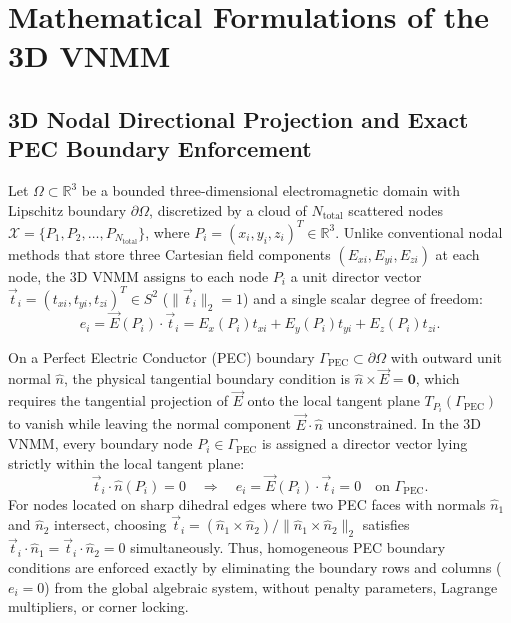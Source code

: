 \documentclass[preprint,12pt]{elsarticle}
\newcommand{\R}{\mathbb{R}}
\begin{document}
\section{Mathematical Formulations of the 3D VNMM}
\label{sec:formulation}

\subsection{3D Nodal Directional Projection and Exact PEC Boundary Enforcement}
\label{subsec:nodal_projection_3d}

Let $\Omega \subset \R^3$ be a bounded three-dimensional electromagnetic domain with Lipschitz boundary $\partial\Omega$, discretized by a cloud of $N_{\text{total}}$ scattered nodes $\mathcal{X} = \{P_1, P_2, \dots, P_{N_{\text{total}}}\}$, where $P_i = (x_i, y_i, z_i)^T \in \R^3$. Unlike conventional nodal methods that store three Cartesian field components $(E_{xi}, E_{yi}, E_{zi})$ at each node, the 3D VNMM assigns to each node $P_i$ a unit director vector $\vec{t}_i = (t_{xi}, t_{yi}, t_{zi})^T \in S^2$ ($\|\vec{t}_i\|_2 = 1$) and a single scalar degree of freedom:
\begin{equation}
    e_i = \vec{E}(P_i) \cdot \vec{t}_i = E_x(P_i) t_{xi} + E_y(P_i) t_{yi} + E_z(P_i) t_{zi}.
    \label{eq:vnmm3d_dof}
\end{equation}

On a Perfect Electric Conductor (PEC) boundary $\Gamma_{\text{PEC}} \subset \partial\Omega$ with outward unit normal $\hat{n}$, the physical tangential boundary condition is $\hat{n} \times \vec{E} = \mathbf{0}$, which requires the tangential projection of $\vec{E}$ onto the local tangent plane $T_{P_i}(\Gamma_{\text{PEC}})$ to vanish while leaving the normal component $\vec{E} \cdot \hat{n}$ unconstrained. In the 3D VNMM, every boundary node $P_i \in \Gamma_{\text{PEC}}$ is assigned a director vector lying strictly within the local tangent plane:
\begin{equation}
    \vec{t}_i \cdot \hat{n}(P_i) = 0 \quad \Longrightarrow \quad e_i = \vec{E}(P_i) \cdot \vec{t}_i = 0 \quad \text{on } \Gamma_{\text{PEC}}.
    \label{eq:pec_bc_3d}
\end{equation}
For nodes located on sharp dihedral edges where two PEC faces with normals $\hat{n}_1$ and $\hat{n}_2$ intersect, choosing $\vec{t}_i = (\hat{n}_1 \times \hat{n}_2)/\|\hat{n}_1 \times \hat{n}_2\|_2$ satisfies $\vec{t}_i \cdot \hat{n}_1 = \vec{t}_i \cdot \hat{n}_2 = 0$ simultaneously. Thus, homogeneous PEC boundary conditions are enforced exactly by eliminating the boundary rows and columns ($e_i = 0$) from the global algebraic system, without penalty parameters, Lagrange multipliers, or corner locking.
\end{document}
